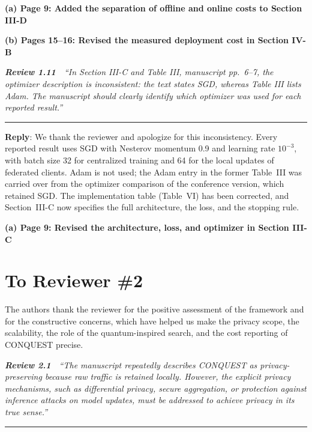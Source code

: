 \documentclass[11pt]{article}
\newcommand{\review}[2]{\par\bigskip\noindent\textbf{\textit{Review #1}}\ \ \textit{``#2''}\par\smallskip\hrule\medskip}
\newcommand{\reply}{\noindent\textbf{Reply}: }
\newcommand{\loc}[1]{\par\medskip\noindent\textbf{#1}\par}
\begin{document}
\loc{(a) Page 9: Added the separation of offline and online costs to Section III-D}

\loc{(b) Pages 15--16: Revised the measured deployment cost in Section IV-B}

\review{1.11}{In Section III-C and Table III, manuscript pp.~6--7, the optimizer description is inconsistent: the text states SGD, whereas Table III lists Adam. The manuscript should clearly identify which optimizer was used for each reported result.}

\reply We thank the reviewer and apologize for this inconsistency. Every
reported result uses SGD with Nesterov momentum 0.9 and learning rate
$10^{-3}$, with batch size 32 for centralized training and 64 for the local
updates of federated clients. Adam is not used; the Adam entry in the former
Table~III was carried over from the optimizer comparison of the conference
version, which retained SGD. The implementation table (Table~VI) has been
corrected, and Section~III-C now specifies the full architecture, the loss,
and the stopping rule.

\loc{(a) Page 9: Revised the architecture, loss, and optimizer in Section III-C}

\clearpage
\section*{To Reviewer \#2}

The authors thank the reviewer for the positive assessment of the framework
and for the constructive concerns, which have helped us make the privacy
scope, the scalability, the role of the quantum-inspired search, and the
cost reporting of CONQUEST precise.

\review{2.1}{The manuscript repeatedly describes CONQUEST as privacy-preserving because raw traffic is retained locally. However, the explicit privacy mechanisms, such as differential privacy, secure aggregation, or protection against inference attacks on model updates, must be addressed to achieve privacy in its true sense.}
\end{document}
